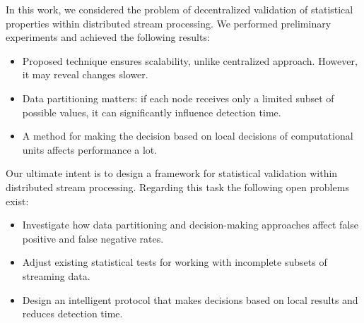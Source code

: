 \label {fs-short-conclusion}

In this work, we considered the problem of decentralized validation of statistical properties within distributed stream processing. We performed preliminary experiments and achieved the following results:
\begin{itemize}
    \item Proposed technique ensures scalability, unlike centralized approach. However, it may reveal changes slower.
    \item Data partitioning matters: if each node receives only a limited subset of possible values, it can significantly influence detection time.
    \item A method for making the decision based on local decisions of computational units affects performance a lot.
\end{itemize}

Our ultimate intent is to design a framework for statistical validation within distributed stream processing. Regarding this task the following open problems exist:

\begin{itemize}
    \item Investigate how data partitioning and decision-making approaches affect false positive and false negative rates.
    \item Adjust existing statistical tests for working with incomplete subsets of streaming data.
    \item Design an intelligent protocol that makes decisions based on local results and reduces detection time.
\end{itemize}